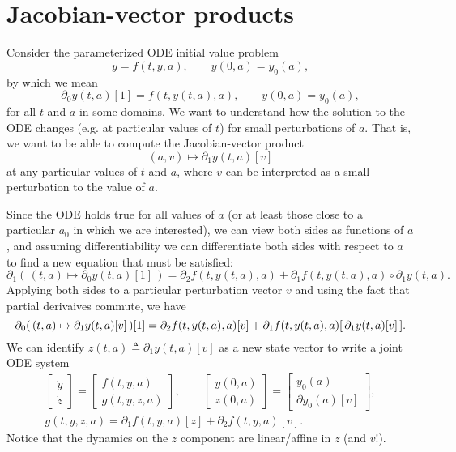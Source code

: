 \documentclass{article}
\begin{document}
\section{Jacobian-vector products}
Consider the parameterized ODE initial value problem
\begin{equation}
    \dot y = f(t, y, a), \qquad y(0, a) = y_0(a),
\end{equation}
by which we mean
\begin{equation}
    \partial_0 y(t, a)[1] = f(t, y(t, a), a), \qquad y(0, a) = y_0(a),
\end{equation}
for all $t$ and $a$ in some domains.
We want to understand how the solution to the ODE changes (e.g. at particular
values of $t$) for small perturbations of $a$. That is, we want to be able to
compute the Jacobian-vector product
\begin{equation}
    (a, v) \mapsto \partial_1 y(t, a)[v]
\end{equation}
at any particular values of $t$ and $a$, where $v$ can be interpreted as a
small perturbation to the value of $a$.

Since the ODE holds true for all values of $a$ (or at least those close to a
particular $a_0$ in which we are interested), we can view both sides as
functions of $a$, and assuming differentiability we can differentiate both
sides with respect to $a$ to find a new equation that must be satisfied:
\begin{equation}
    \partial_1 (\, (t, a) \mapsto \partial_0 y(t, a)[1] \,) = \partial_2 f(t, y(t, a), a) + \partial_1 f(t, y(t, a), a) \circ \partial_1 y(t, a).
\end{equation}
Applying both sides to a particular perturbation vector $v$ and using the fact
that partial derivaives commute, we have
\begin{equation}
    \partial_0 (\, (t, a) \mapsto \partial_1 y(t, a)[v] \,)[1] = \partial_2 f(t, y(t, a), a)[v] + \partial_1 f(t, y(t, a), a) [ \, \partial_1 y(t, a)[v] \,].
    \notag
\end{equation}
We can identify $z(t, a) \triangleq \partial_1 y(t, a)[v]$ as a new state
vector to write a joint ODE system
\begin{gather}
    \begin{bmatrix}
        \dot y \\
        \dot z
    \end{bmatrix}
    =
    \begin{bmatrix}
        f(t, y, a) \\
        g(t, y, z, a)
    \end{bmatrix},
    \qquad
    \begin{bmatrix}
        y(0, a) \\
        z(0, a)
    \end{bmatrix}
    =
    \begin{bmatrix}
        y_0(a) \\
        \partial y_0(a)[v]
    \end{bmatrix},
    \\
    g(t, y, z, a) = \partial_1 f(t, y, a)[z] + \partial_2 f(t, y, a)[v].
\end{gather}
Notice that the dynamics on the $z$ component are linear/affine in $z$ (and $v$!).
\end{document}
